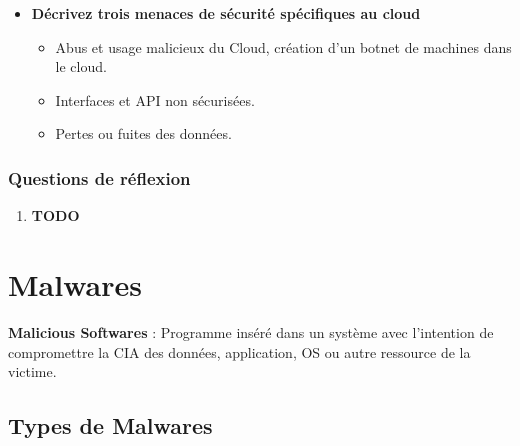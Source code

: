 \documentclass{report}
\begin{document}
\begin{itemize}
				\item \textbf{Décrivez trois menaces de sécurité spécifiques au cloud}

					\begin{itemize}
						\item Abus et usage malicieux du Cloud, création d'un botnet de machines dans le cloud.
						\item Interfaces et API non sécurisées.
						\item Pertes ou fuites des données.\\
					\end{itemize}
			\end{itemize}
			

		\subsection{Questions de réflexion}

			\begin{enumerate}
				\item \textbf{TODO}
			\end{enumerate}

\chapter{Malwares}

	\textbf{Malicious Softwares} : Programme inséré dans un système avec l'intention de compromettre la CIA des données, application, OS ou autre ressource de la victime.\\

	\section{Types de Malwares}
\end{document}
